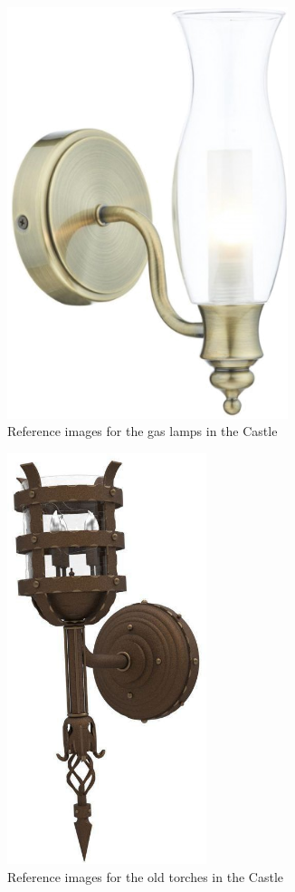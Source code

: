 \begin{figure}[H]
  \centering
  \includegraphics[height=12cm]{Images/Landmarks/gasLamp}
  \caption{Reference images for the gas lamps in the Castle}
\end{figure}

\begin{figure}[H]
  \centering
  \includegraphics[height=12cm]{Images/Landmarks/torch}
  \caption{Reference images for the old torches in the Castle}
\end{figure}
